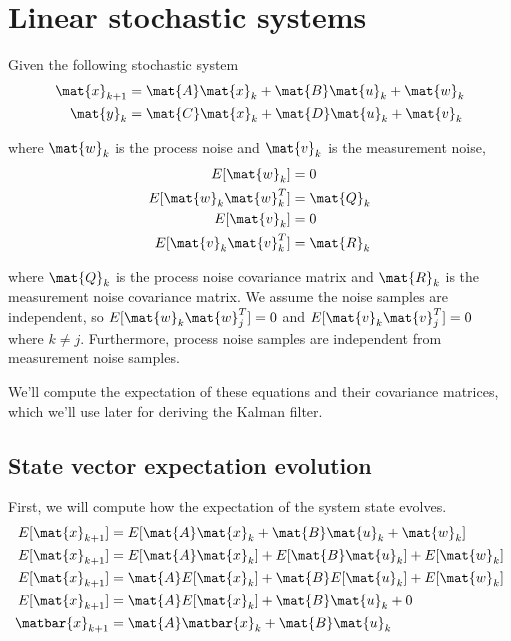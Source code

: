 \section{Linear stochastic systems}

Given the following stochastic system
\begin{align*}
  \mat{x}_{k+1} &= \mat{A}\mat{x}_k + \mat{B}\mat{u}_k + \mat{w}_k \\
  \mat{y}_k &= \mat{C}\mat{x}_k + \mat{D}\mat{u}_k + \mat{v}_k
\end{align*}

where $\mat{w}_k$ is the process noise and $\mat{v}_k$ is the measurement noise,
 
\begin{align*}
  E[\mat{w}_k] &= 0 \\
  E[\mat{w}_k\mat{w}_k^T] &= \mat{Q}_k \\
  E[\mat{v}_k] &= 0 \\
  E[\mat{v}_k\mat{v}_k^T] &= \mat{R}_k
\end{align*}

where $\mat{Q}_k$ is the process noise covariance matrix and $\mat{R}_k$ is the
measurement noise covariance matrix. We assume the noise samples are
independent, so $E[\mat{w}_k\mat{w}_j^T] = 0$ and $E[\mat{v}_k\mat{v}_j^T] = 0$
where $k \neq j$. Furthermore, process noise samples are independent from
measurement noise samples.

We'll compute the expectation of these equations and their covariance matrices,
which we'll use later for deriving the Kalman filter.

\subsection{State vector expectation evolution}

First, we will compute how the expectation of the \gls{system} \gls{state}
evolves.
\begin{align*}
  E[\mat{x}_{k+1}] &= E[\mat{A}\mat{x}_k + \mat{B}\mat{u}_k + \mat{w}_k] \\
  E[\mat{x}_{k+1}] &= E[\mat{A}\mat{x}_k] + E[\mat{B}\mat{u}_k] +
    E[\mat{w}_k] \\
  E[\mat{x}_{k+1}] &= \mat{A}E[\mat{x}_k] + \mat{B}E[\mat{u}_k] +
    E[\mat{w}_k] \\
  E[\mat{x}_{k+1}] &= \mat{A}E[\mat{x}_k] + \mat{B}\mat{u}_k + 0 \\
  \matbar{x}_{k+1} &= \mat{A}\matbar{x}_k + \mat{B}\mat{u}_k \\
\end{align*}

